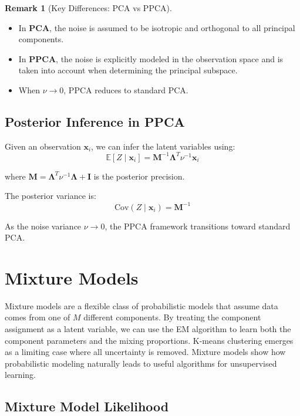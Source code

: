 \documentclass[12pt,a4paper]{article}
\theoremstyle{definition}
\newtheorem{remark}{Remark}[section]
\begin{document}
\begin{remark}[Key Differences: PCA vs PPCA]
\begin{itemize}
    \item In \textbf{PCA}, the noise is assumed to be isotropic and orthogonal to all principal components.
    \item In \textbf{PPCA}, the noise is explicitly modeled in the observation space and is taken into account when determining the principal subspace.
    \item When $\nu \to 0$, PPCA reduces to standard PCA.
\end{itemize}
\end{remark}

\subsection{Posterior Inference in PPCA}

Given an observation $\mathbf{x}_i$, we can infer the latent variables using:
\[
\mathbb{E}[Z \mid \mathbf{x}_i] = \mathbf{M}^{-1} \mathbf{\Lambda}^T \nu^{-1} \mathbf{x}_i
\]

where $\mathbf{M} = \mathbf{\Lambda}^T \nu^{-1} \mathbf{\Lambda} + \mathbf{I}$ is the posterior precision.

The posterior variance is:
\[
\text{Cov}(Z \mid \mathbf{x}_i) = \mathbf{M}^{-1}
\]

As the noise variance $\nu \to 0$, the PPCA framework transitions toward standard PCA.

\section{Mixture Models}

Mixture models are a flexible class of probabilistic models that assume data comes from one of $M$ different components. By treating the component assignment as a latent variable, we can use the EM algorithm to learn both the component parameters and the mixing proportions. K-means clustering emerges as a limiting case where all uncertainty is removed. Mixture models show how probabilistic modeling naturally leads to useful algorithms for unsupervised learning.

\subsection{Mixture Model Likelihood}
\end{document}
